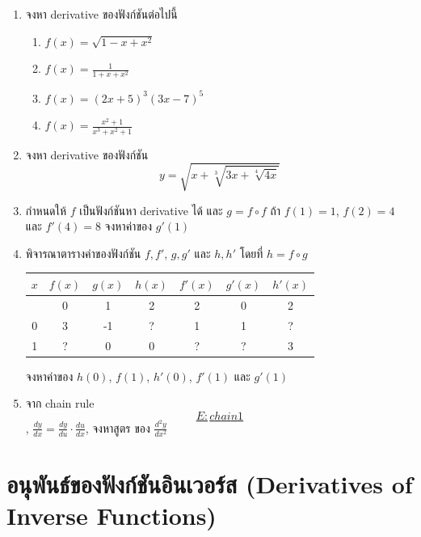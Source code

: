 \documentclass[
]{book}
\theoremstyle{definition}
\theoremstyle{definition}
\theoremstyle{definition}
\theoremstyle{definition}
\theoremstyle{remark}
\begin{document}
\begin{enumerate}
\def\labelenumi{\arabic{enumi}.}
\item
  จงหา derivative ของฟังก์ชันต่อไปนี้

  \begin{enumerate}
  \def\labelenumii{\arabic{enumii}.}
  \item
    \(\displaystyle f(x) = \sqrt{1-x+x^2}\)
  \item
    \(\displaystyle f(x) = \frac{1}{1+x+x^2}\)
  \item
    \(\displaystyle f(x) = (2x+5)^3(3x-7)^5\)
  \item
    \(\displaystyle f(x) = \frac{x^2+1}{x^3+x^2+1}\)
  \end{enumerate}
\item
  จงหา derivative ของฟังก์ชัน
  \[y = \sqrt{x + \sqrt[3]{3x + \sqrt[4]{4x}}}\]
\item
  กำหนดให้ \(f\) เป็นฟังก์ชันหา derivative ได้ และ \(g = f \circ f\) ถ้า
  \(f(1) = 1\), \(f(2) = 4\) และ \(f'(4) = 8\) จงหาค่าของ \(g'(1)\)
\item
  พิจารณาตารางค่าของฟังก์ชัน \(f, f'\), \(g, g'\) และ \(h, h'\) โดยที่ \(h=f\circ g\)

  \begin{longtable}[]{@{}ccccccc@{}}
  \toprule\noalign{}
  \(x\) & \(f(x)\) & \(g(x)\) & \(h(x)\) & \(f'(x)\) & \(g'(x)\) & \(h'(x)\) \\
  \midrule\noalign{}
  \endhead
  \bottomrule\noalign{}
  \endlastfoot
  -1 & 0 & 1 & 2 & 2 & 0 & 2 \\
  0 & 3 & -1 & ? & 1 & 1 & ? \\
  1 & ? & 0 & 0 & ? & ? & 3 \\
  \end{longtable}

  จงหาค่าของ \(h(0)\), \(f(1)\), \(h'(0)\), \(f'(1)\) และ \(g'(1)\)
\item
  จาก chain rule~\hyperref[E:chain1]{\[E:chain1\]},
  \(\frac{dy}{dx} = \frac{dy}{du} \cdot \frac{du}{dx}\), จงหาสูตร ของ
  \(\displaystyle \frac{d^2y}{dx^2}\)
\end{enumerate}

\section{อนุพันธ์ของฟังก์ชันอินเวอร์ส (Derivatives of Inverse Functions)}\label{uxe2duxe19uxe1euxe19uxe18uxe02uxe2duxe07uxe1fuxe07uxe01uxe0auxe19uxe2duxe19uxe40uxe27uxe2duxe23uxe2a-derivatives-of-inverse-functions}
\end{document}

